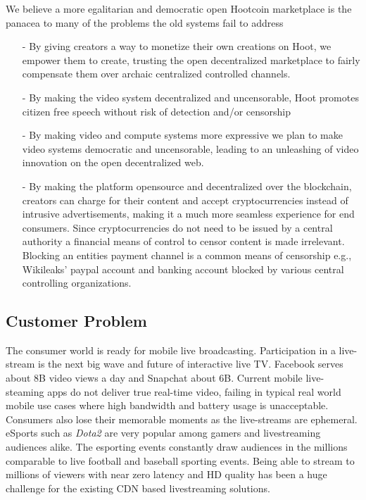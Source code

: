 \documentclass{article}
\begin{document}
We believe a more egalitarian and democratic open Hootcoin marketplace is the
panacea to many of the problems the old systems fail to address
\begin{itemize}
\item[-] By giving creators a way to monetize their own creations on Hoot, we
empower them to create, trusting the open decentralized marketplace to fairly compensate
them over archaic centralized controlled channels.
\item[-] By making the video system decentralized and uncensorable, Hoot promotes
  citizen free speech without risk of detection and/or censorship
\item[-] By making video and compute systems more expressive we
  plan to make video systems democratic and uncensorable, leading
  to an unleashing of video innovation on the open decentralized web.
\item[-] By making the platform opensource and decentralized over the
  blockchain, creators can charge for their content and accept
  cryptocurrencies instead of intrusive advertisements, making it a
  much more seamless experience for end consumers. Since
  cryptocurrencies do not need to be issued by a central authority
  a financial means of control to censor content is made irrelevant. Blocking an entities
  payment channel is a common means of censorship e.g.,  Wikileaks'
  paypal account and banking account blocked by various central controlling organizations.
\end{itemize}


\subsection{Customer Problem}
The consumer world is ready for mobile live broadcasting. Participation in a live-stream is the next big wave and future of interactive live TV. Facebook serves about 8B video views a day and Snapchat about 6B. Current mobile live-steaming apps do not deliver true real-time video, failing in typical real world mobile use cases where high bandwidth and battery usage is unacceptable. Consumers also lose their memorable moments as the live-streams are ephemeral. eSports such as \emph{Dota2} are very popular among gamers and livestreaming audiences alike. The esporting events constantly draw audiences in the millions comparable to live football and baseball sporting events. Being able to stream to millions of viewers with near zero latency and HD quality has been a huge challenge for the existing CDN based livestreaming solutions.
\end{document}
